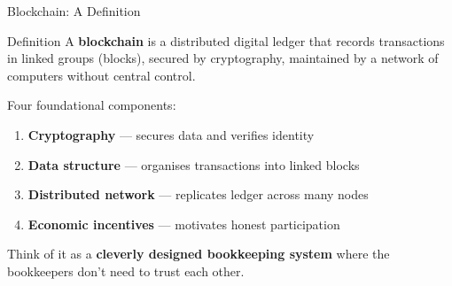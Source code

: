 \documentclass[10pt]{beamer}
\newcommand{\highlight}[1]{\textcolor{AccentOrange}{\textbf{#1}}}
\begin{document}
\begin{frame}{Blockchain: A Definition}
  \begin{block}{Definition}
    A \textbf{blockchain} is a distributed digital ledger that records transactions in linked groups (blocks), secured by cryptography, maintained by a network of computers without central control.
  \end{block}
  
  \vspace{1em}
  Four foundational components:
  
  \vspace{0.5em}
  \begin{enumerate}
    \item \textbf{Cryptography} --- secures data and verifies identity
    \item \textbf{Data structure} --- organises transactions into linked blocks
    \item \textbf{Distributed network} --- replicates ledger across many nodes
    \item \textbf{Economic incentives} --- motivates honest participation
  \end{enumerate}
  
  \vspace{1em}
  Think of it as a \highlight{cleverly designed bookkeeping system} where the bookkeepers don't need to trust each other.
\end{frame}
\end{document}
